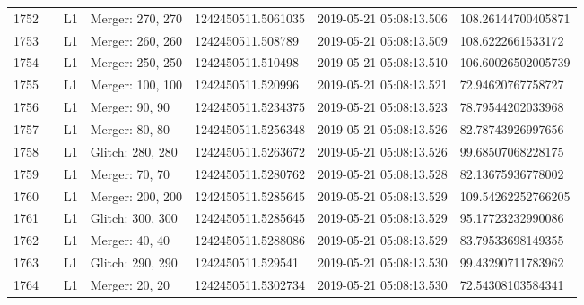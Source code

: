 \begin{longtable}{lllllll}
1752 &                                                    &       L1 &  Merger: 270, 270 &  1242450511.5061035 &  2019-05-21 05:08:13.506 &  108.26144700405871 \\
1753 &                                                    &       L1 &  Merger: 260, 260 &   1242450511.508789 &  2019-05-21 05:08:13.509 &   108.6222661533172 \\
1754 &                                                    &       L1 &  Merger: 250, 250 &   1242450511.510498 &  2019-05-21 05:08:13.510 &  106.60026502005739 \\
1755 &                                                    &       L1 &  Merger: 100, 100 &   1242450511.520996 &  2019-05-21 05:08:13.521 &   72.94620767758727 \\
1756 &                                                    &       L1 &    Merger: 90, 90 &  1242450511.5234375 &  2019-05-21 05:08:13.523 &   78.79544202033968 \\
1757 &                                                    &       L1 &    Merger: 80, 80 &  1242450511.5256348 &  2019-05-21 05:08:13.526 &   82.78743926997656 \\
1758 &                                                    &       L1 &  Glitch: 280, 280 &  1242450511.5263672 &  2019-05-21 05:08:13.526 &   99.68507068228175 \\
1759 &                                                    &       L1 &    Merger: 70, 70 &  1242450511.5280762 &  2019-05-21 05:08:13.528 &   82.13675936778002 \\
1760 &                                                    &       L1 &  Merger: 200, 200 &  1242450511.5285645 &  2019-05-21 05:08:13.529 &  109.54262252766205 \\
1761 &                                                    &       L1 &  Glitch: 300, 300 &  1242450511.5285645 &  2019-05-21 05:08:13.529 &   95.17723232990086 \\
1762 &                                                    &       L1 &    Merger: 40, 40 &  1242450511.5288086 &  2019-05-21 05:08:13.529 &   83.79533698149355 \\
1763 &                                                    &       L1 &  Glitch: 290, 290 &   1242450511.529541 &  2019-05-21 05:08:13.530 &   99.43290711783962 \\
1764 &                                                    &       L1 &    Merger: 20, 20 &  1242450511.5302734 &  2019-05-21 05:08:13.530 &   72.54308103584341 \\

\end{longtable}
